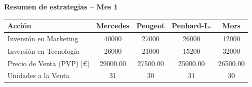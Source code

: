 \documentclass{standalone}
\begin{document}
	\leavevmode
	
	\begin{minipage}{1.02\linewidth}
		\centering
		
		\textbf{Resumen de estrategias – Mes 1}\\[0.5em]
		\begin{tabular}{@{}l
				S[table-format=5.0]
				S[table-format=5.0]
				S[table-format=5.0]
				S[table-format=5.0]@{}}
			\toprule
			\textbf{Acción} & \textbf{Mercedes} & \textbf{Peugeot} & \textbf{Penhard-L.} & \textbf{Mors} \\
			\midrule
			Inversión en Marketing              & 40000  & 27000  & 26000  & 12000 \\
			Inversión en Tecnología             & 26000  & 21000  & 15200  & 32000 \\
			Precio de Venta (PVP) [\euro]       & 29000.00 & 27500.00 & 25000.00 & 26500.00 \\
			Unidades a la Venta                 & 31     & 30     & 31     & 30 \\
			\bottomrule
		\end{tabular}
	\end{minipage}
	
\end{document}
